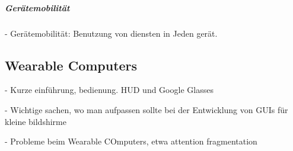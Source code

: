 \subparagraph{Gerätemobilität} 
\label{subp:ger_temobilit_t}

- Gerätemobilität: Benutzung von diensten in Jeden gerät. 



\subsection{Wearable Computers} 
\label{sub:wearable_computers}

- Kurze einführung, bedienung. HUD und Google Glasses

- Wichtige sachen, wo man aufpassen sollte bei der Entwicklung von GUIs für kleine bildshirme

- Probleme beim Wearable COmputers, etwa attention fragmentation
